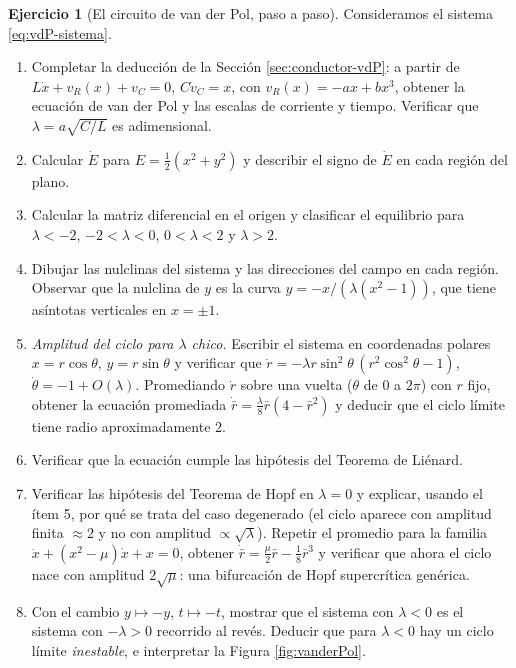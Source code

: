 \documentclass[12pt, a4paper]{amsbook}
\theoremstyle{remark}
\theoremstyle{definition}
\newtheorem{ejer}[teo]{Ejercicio}
\numberwithin{section}{chapter}
\numberwithin{subsection}{section}
\numberwithin{equation}{section}
\numberwithin{figure}{chapter}
\begin{document}
\begin{ejer}[El circuito de van der Pol, paso a paso]\label{ejer:vdP-guiado}
Consideramos el sistema \eqref{eq:vdP-sistema}.
\begin{enumerate}
\item Completar la deducción de la Sección \ref{sec:conductor-vdP}: a partir de $L\dot x + v_R(x) + v_C = 0$, $C\dot v_C = x$, con $v_R(x) = -ax+bx^3$, obtener la ecuación de van der Pol y las escalas de corriente y tiempo. Verificar que $\lambda = a\sqrt{C/L}$ es adimensional.
\item Calcular $\dot E$ para $E=\frac12(x^2+y^2)$ y describir el signo de $\dot E$ en cada región del plano.
\item Calcular la matriz diferencial en el origen y clasificar el equilibrio para $\lambda<-2$, $-2<\lambda<0$, $0<\lambda<2$ y $\lambda>2$.
\item Dibujar las nulclinas del sistema y las direcciones del campo en cada región. Observar que la nulclina de $y$ es la curva $y = -x/(\lambda(x^2-1))$, que tiene asíntotas verticales en $x=\pm1$.
\item \emph{Amplitud del ciclo para $\lambda$ chico.} Escribir el sistema en coordenadas polares $x=r\cos\theta$, $y=r\sin\theta$ y verificar que $\dot r = -\lambda r\sin^2\theta\,(r^2\cos^2\theta-1)$, $\dot\theta = -1 + O(\lambda)$. Promediando $\dot r$ sobre una vuelta ($\theta$ de $0$ a $2\pi$) con $r$ fijo, obtener la ecuación promediada $\dot{\bar r} = \frac{\lambda}{8}\bar r(4-\bar r^2)$ y deducir que el ciclo límite tiene radio aproximadamente $2$.
\item Verificar que la ecuación cumple las hipótesis del Teorema de Liénard.
\item Verificar las hipótesis del Teorema de Hopf en $\lambda=0$ y explicar, usando el ítem 5, por qué se trata del caso degenerado (el ciclo aparece con amplitud finita $\approx 2$ y no con amplitud $\propto\sqrt\lambda$). Repetir el promedio para la familia $\ddot x + (x^2-\mu)\dot x + x = 0$, obtener $\dot{\bar r} = \frac{\mu}{2}\bar r - \frac18\bar r^3$ y verificar que ahora el ciclo nace con amplitud $2\sqrt\mu$: una bifurcación de Hopf supercrítica genérica.
\item Con el cambio $y\mapsto -y$, $t\mapsto -t$, mostrar que el sistema con $\lambda<0$ es el sistema con $-\lambda>0$ recorrido al revés. Deducir que para $\lambda<0$ hay un ciclo límite \emph{inestable}, e interpretar la Figura \ref{fig:vanderPol}.
\end{enumerate}
\end{ejer}
\end{document}
